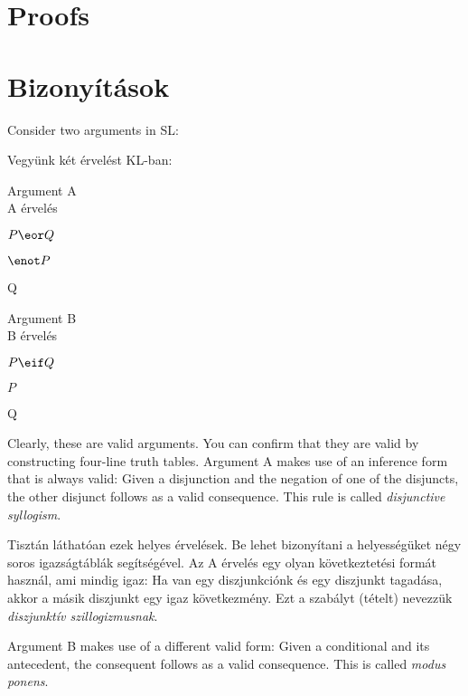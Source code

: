 

\chapter*{Proofs}
\chapter{Bizonyítások}
\label{ch.proofs}

Consider two arguments in SL:

Vegyünk két érvelést KL-ban:

\begin{multicols}{2}
Argument A\\
A érvelés
\begin{earg}
\item[] $P \eor Q$
\item[] $\enot P$
\item[\therefore] Q
\end{earg}

Argument B \\
B érvelés
\begin{earg}
\item[] $P \eif Q$
\item[] $P$
\item[\therefore] Q
\end{earg}

\end{multicols}

Clearly, these are valid arguments. You can confirm that they are valid by constructing four-line truth tables. Argument A makes use of an inference form that is always valid: Given a disjunction and the negation of one of the disjuncts, the other disjunct follows as a valid consequence. This rule is called \emph{disjunctive syllogism}.

Tisztán láthatóan ezek helyes érvelések. Be lehet bizonyítani a helyességüket négy soros igazságtáblák segítségével. Az A érvelés egy olyan következtetési formát használ, ami mindig igaz: Ha van egy diszjunkciónk és egy diszjunkt tagadása, akkor a másik diszjunkt egy igaz következmény. Ezt a szabályt (tételt) nevezzük \emph{diszjunktív szillogizmusnak}.

Argument B makes use of a different valid form: Given a conditional and its antecedent, the consequent follows as a valid consequence. This is called \emph{modus ponens}.

